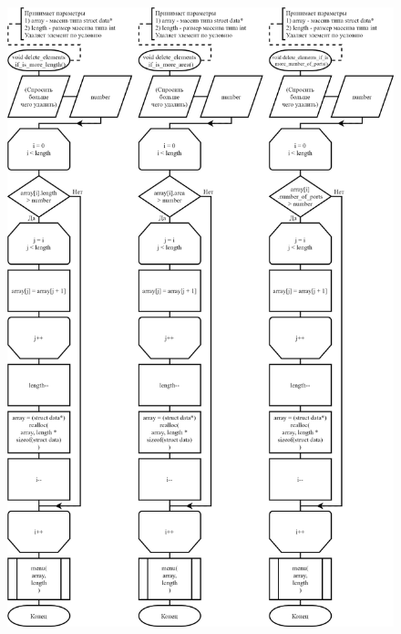 \begin{figure}[!htp]
    \includegraphics[height=24cm]{../src/submenu/delete_by_condition/delete_by_condition-3.png}
\end{figure}

